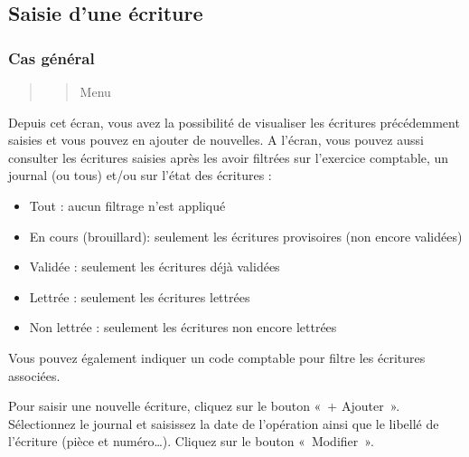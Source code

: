 \documentclass[a4paper,10pt,oneside,french]{sphinxmanual}
\begin{document}
\subsection{Saisie d’une écriture}
\label{\detokenize{accounting/entity:saisie-d-une-ecriture}}

\subsubsection{Cas général}
\label{\detokenize{accounting/entity:cas-general}}\begin{quote}
\begin{quote}

\sphinxAtStartPar
Menu 
\end{quote}

\noindent{}
\end{quote}

\sphinxAtStartPar
Depuis cet écran, vous avez la possibilité de visualiser les écritures précédemment saisies et vous pouvez en ajouter de nouvelles.
A l’écran, vous pouvez aussi consulter les écritures saisies après les avoir filtrées sur l’exercice comptable, un journal (ou tous)  et/ou sur l’état des écritures :
\begin{itemize}
\item {} 
\sphinxAtStartPar
Tout : aucun filtrage n’est appliqué

\item {} 
\sphinxAtStartPar
En cours (brouillard): seulement les écritures provisoires (non encore validées)

\item {} 
\sphinxAtStartPar
Validée : seulement les écritures déjà validées

\item {} 
\sphinxAtStartPar
Lettrée : seulement les écritures lettrées

\item {} 
\sphinxAtStartPar
Non lettrée : seulement les écritures non encore lettrées

\end{itemize}

\sphinxAtStartPar
Vous pouvez également indiquer un code comptable pour filtre les écritures associées.

\sphinxAtStartPar
Pour saisir une nouvelle écriture, cliquez sur le bouton « + Ajouter ».
Sélectionnez le journal et saisissez la date de l’opération ainsi que le libellé de l’écriture (pièce et numéro…). Cliquez sur le bouton « Modifier ».
\end{document}

